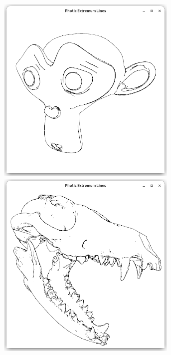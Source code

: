 \documentclass[9pt,fleqn,twoside,twocolumn]{stdglobal}
\begin{document}
\begin{figure}
\begin{subfigure}[t]{0.19\textwidth}
        \includegraphics[width=0.95\textwidth,trim={15px 15 15 50},clip]{images/results/suzanne-contours-pel.png}
        \includegraphics[width=0.95\textwidth,trim={15px 15 15 50},clip]{images/results/skull-contours-pel.png}

\end{subfigure}
\end{figure}
\end{document}

